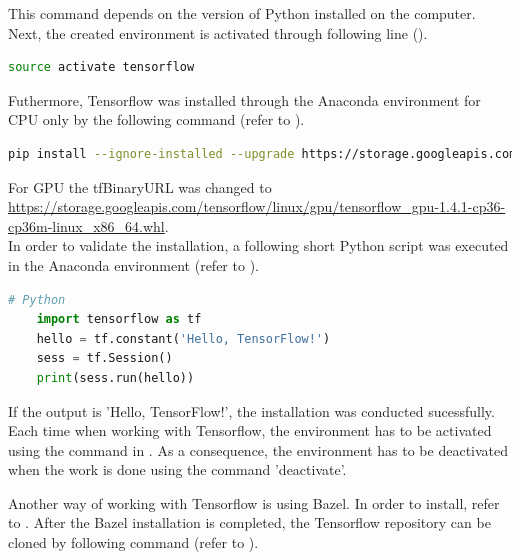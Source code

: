This command depends on the version of Python installed on the computer. Next, the created environment is activated through following line ().

\begin{lstlisting}[caption=Activating the Anaconda environment, label=list:activation_anaconda, language=bash]
	source activate tensorflow
\end{lstlisting}

Futhermore, Tensorflow was installed through the Anaconda environment for CPU only by the following command (refer to ).

\begin{lstlisting}[caption=Installing Tensorflow through Anaconda, label=list:installing_tensorflow_anaconda, language=bash]
	pip install --ignore-installed --upgrade https://storage.googleapis.com/tensorflow/linux/cpu/	tensorflow-1.4.1-cp36-cp36m-linux_x86_64.whl
\end{lstlisting}

For GPU the tfBinaryURL was changed to \url{https://storage.googleapis.com/tensorflow/linux/gpu/tensorflow_gpu-1.4.1-cp36-cp36m-linux_x86_64.whl}. \\

In order to validate the installation, a following short Python script was executed in the Anaconda environment (refer to ).

\begin{lstlisting}[caption=Installing Tensorflow through Anaconda, label=list:validation_installation, language=python]
	# Python
	import tensorflow as tf
	hello = tf.constant('Hello, TensorFlow!')
	sess = tf.Session()
	print(sess.run(hello))
\end{lstlisting}

If the output is 'Hello, TensorFlow!', the installation was conducted sucessfully. Each time when working with Tensorflow, the environment has to be activated using the command in . As a consequence, the environment has to be deactivated when the work is done using the command 'deactivate'.

Another way of working with Tensorflow is using Bazel. In order to install, refer to . 
After the Bazel installation is completed, the Tensorflow repository can be cloned by following command (refer to ).

